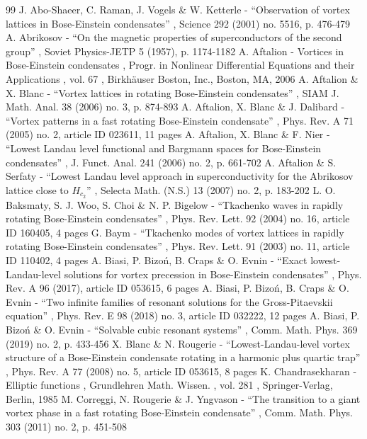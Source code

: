 \documentclass[10pt]{amsart}
\theoremstyle{definition}
\begin{document}
\backmatter

\begin{thebibliography}{99}
 J. Abo-Shaeer, C. Raman, J. Vogels \& W. Ketterle - “Observation of vortex lattices in Bose-Einstein condensates” , Science 292 (2001) no. 5516, p. 476-479
 A. Abrikosov - “On the magnetic properties of superconductors of the second group” , Soviet Physics-JETP 5 (1957), p. 1174-1182
 A. Aftalion - Vortices in Bose-Einstein condensates , Progr. in Nonlinear Differential Equations and their Applications , vol. 67 , Birkhäuser Boston, Inc., Boston, MA, 2006
 A. Aftalion \& X. Blanc - “Vortex lattices in rotating Bose-Einstein condensates” , SIAM J. Math. Anal. 38 (2006) no. 3, p. 874-893
 A. Aftalion, X. Blanc \& J. Dalibard - “Vortex patterns in a fast rotating Bose-Einstein condensate” , Phys. Rev. A 71 (2005) no. 2, article ID 023611, 11 pages
 A. Aftalion, X. Blanc \& F. Nier - “Lowest Landau level functional and Bargmann spaces for Bose-Einstein condensates” , J. Funct. Anal. 241 (2006) no. 2, p. 661-702
 A. Aftalion \& S. Serfaty - “Lowest Landau level approach in superconductivity for the Abrikosov lattice close to $H_{c_2}$” , Selecta Math. (N.S.) 13 (2007) no. 2, p. 183-202
 L. O. Baksmaty, S. J. Woo, S. Choi \& N. P. Bigelow - “Tkachenko waves in rapidly rotating Bose-Einstein condensates” , Phys. Rev. Lett. 92 (2004) no. 16, article ID 160405, 4 pages
 G. Baym - “Tkachenko modes of vortex lattices in rapidly rotating Bose-Einstein condensates” , Phys. Rev. Lett. 91 (2003) no. 11, article ID 110402, 4 pages
 A. Biasi, P. Bizoń, B. Craps \& O. Evnin - “Exact lowest-Landau-level solutions for vortex precession in Bose-Einstein condensates” , Phys. Rev. A 96 (2017), article ID 053615, 6 pages
 A. Biasi, P. Bizoń, B. Craps \& O. Evnin - “Two infinite families of resonant solutions for the Gross-Pitaevskii equation” , Phys. Rev. E 98 (2018) no. 3, article ID 032222, 12 pages
 A. Biasi, P. Bizoń \& O. Evnin - “Solvable cubic resonant systems” , Comm. Math. Phys. 369 (2019) no. 2, p. 433-456
 X. Blanc \& N. Rougerie - “Lowest-Landau-level vortex structure of a Bose-Einstein condensate rotating in a harmonic plus quartic trap” , Phys. Rev. A 77 (2008) no. 5, article ID 053615, 8 pages
 K. Chandrasekharan - Elliptic functions , Grundlehren Math. Wissen. , vol. 281 , Springer-Verlag, Berlin, 1985
 M. Correggi, N. Rougerie \& J. Yngvason - “The transition to a giant vortex phase in a fast rotating Bose-Einstein condensate” , Comm. Math. Phys. 303 (2011) no. 2, p. 451-508

\end{thebibliography}
\end{document}

